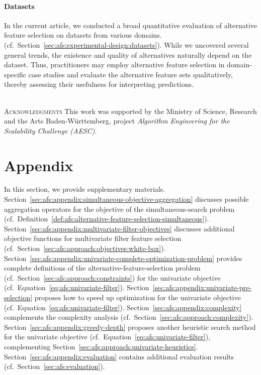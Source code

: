 \documentclass{article}
\theoremstyle{definition}
\begin{document}
\paragraph{Datasets}

In the current article, we conducted a broad quantitative evaluation of alternative feature selection on datasets from various domains. (cf.~Section~\ref{sec:afs:experimental-design:datasets}).
While we uncovered several general trends, the existence and quality of alternatives naturally depend on the dataset.
Thus, practitioners may employ alternative feature selection in domain-specific case studies and evaluate the alternative feature sets qualitatively, thereby assessing their usefulness for interpreting predictions.

~\\
\noindent \textsc{Acknowledgments}\quad
This work was supported by the Ministry of Science, Research and the Arts Baden-Württemberg, project \emph{Algorithm Engineering for the Scalability Challenge (AESC)}.

\appendix

\section{Appendix}
\label{sec:afs:appendix}

In this section, we provide supplementary materials.
Section~\ref{sec:afs:appendix:simultaneous-objective-aggregation} discusses possible aggregation operators for the objective of the simultaneous-search problem (cf.~Definition~\ref{def:afs:alternative-feature-selection-simultaneous}).
Section~\ref{sec:afs:appendix:multivariate-filter-objectives} discusses additional objective functions for multivariate filter feature selection (cf.~Section~\ref{sec:afs:approach:objectives:white-box}).
Section~\ref{sec:afs:appendix:univariate-complete-optimization-problem} provides complete definitions of the alternative-feature-selection problem (cf.~Section~\ref{sec:afs:approach:constraints}) for the univariate objective (cf.~Equation~\ref{eq:afs:univariate-filter}).
Section~\ref{sec:afs:appendix:univariate-pre-selection} proposes how to speed up optimization for the univariate objective (cf.~Equation~\ref{eq:afs:univariate-filter}).
Section~\ref{sec:afs:appendix:complexity} complements the complexity analysis (cf.~Section~\ref{sec:afs:approach:complexity}).
Section~\ref{sec:afs:appendix:greedy-depth} proposes another heuristic search method for the univariate objective (cf.~Equation~\ref{eq:afs:univariate-filter}), complementing Section~\ref{sec:afs:approach:univariate-heuristics}.
Section~\ref{sec:afs:appendix:evaluation} contains additional evaluation results (cf.~Section~\ref{sec:afs:evaluation}).
\end{document}
